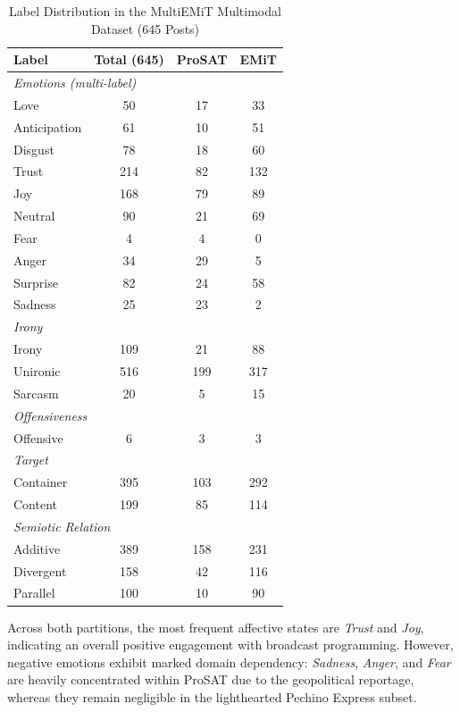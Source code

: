 \begin{table}[!t]
\centering
\caption{Label Distribution in the MultiEMiT Multimodal Dataset (645 Posts)}
\label{table:multi_dist}
\begin{tabular}{l c c c}
\hline
\textbf{Label} & \textbf{Total (645)} & \textbf{ProSAT} & \textbf{EMiT} \\
\hline
\multicolumn{4}{l}{\textit{Emotions (multi-label)}} \\
\hline
Love & 50 & 17 & 33 \\
Anticipation & 61 & 10 & 51 \\
Disgust & 78 & 18 & 60 \\
Trust & 214 & 82 & 132 \\
Joy & 168 & 79 & 89 \\
Neutral & 90 & 21 & 69 \\
Fear & 4 & 4 & 0 \\
Anger & 34 & 29 & 5 \\
Surprise & 82 & 24 & 58 \\
Sadness & 25 & 23 & 2 \\
\hline
\multicolumn{4}{l}{\textit{Irony}} \\
\hline
Irony & 109 & 21 & 88 \\
Unironic & 516 & 199 & 317 \\
Sarcasm & 20 & 5 & 15 \\
\hline
\multicolumn{4}{l}{\textit{Offensiveness}} \\
\hline
Offensive & 6 & 3 & 3 \\
\hline
\multicolumn{4}{l}{\textit{Target}} \\
\hline
Container & 395 & 103 & 292 \\
Content & 199 & 85 & 114 \\
\hline
\multicolumn{4}{l}{\textit{Semiotic Relation}} \\
\hline
Additive & 389 & 158 & 231 \\
Divergent & 158 & 42 & 116 \\
Parallel & 100 & 10 & 90 \\
\hline
\end{tabular}
\end{table}

Across both partitions, the most frequent affective states are \textit{Trust} and \textit{Joy}, indicating an overall positive engagement with broadcast programming. However, negative emotions exhibit marked domain dependency: \textit{Sadness}, \textit{Anger}, and \textit{Fear} are heavily concentrated within ProSAT due to the geopolitical reportage, whereas they remain negligible in the lighthearted Pechino Express subset.

